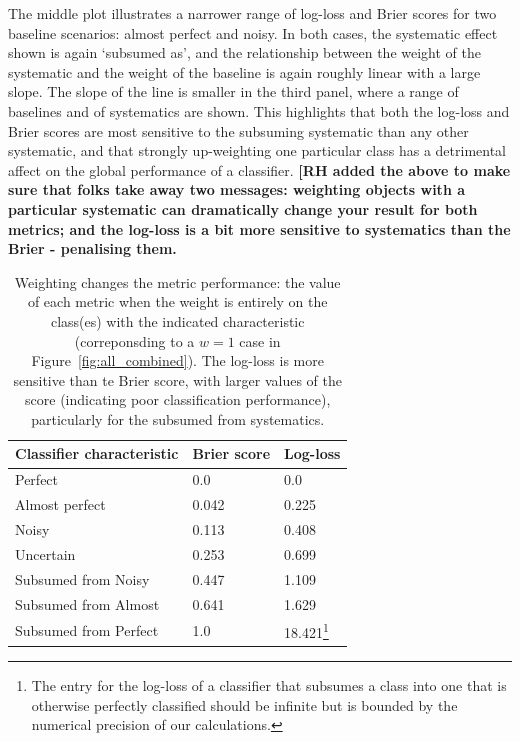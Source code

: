 The middle plot illustrates a narrower range of log-loss and Brier scores for two baseline scenarios: almost perfect and noisy.
In both cases, the systematic effect shown is again `subsumed as', and the relationship between the weight of the systematic and the weight of the baseline is again roughly linear with a large slope. 
The slope of the line is smaller in the third panel, where a range of baselines and of systematics are shown. This highlights that both the log-loss and Brier scores are most sensitive to the subsuming systematic than any other systematic, and that strongly up-weighting one particular class has a detrimental affect on the global performance of a classifier.
\textbf{[RH added the above to make sure that folks take away two messages: weighting objects with a particular systematic can dramatically change your result for both metrics; and the log-loss is a bit more sensitive to systematics than the Brier - penalising them.}





\begin{table}[]
\begin{tabular}{lll}
Classifier characteristic & Brier score & Log-loss\\
\hline
Perfect & 0.0 & 0.0\\
Almost perfect & 0.042 & 0.225\\
Noisy & 0.113 & 0.408\\
Uncertain & 0.253 & 0.699\\
Subsumed from Noisy & 0.447 & 1.109\\
Subsumed from Almost & 0.641 & 1.629\\
Subsumed from Perfect & 1.0 & 18.421\footnote{The entry for the log-loss of a classifier that subsumes a class into one that is otherwise perfectly classified should be infinite but is bounded by the numerical precision of our calculations.}
\end{tabular}
\caption{Weighting changes the metric performance: the value of each metric when the weight is entirely on the class(es) with the indicated characteristic (correponsding to a $w=1$ case in Figure~\ref{fig:all_combined}). The log-loss is more sensitive than te Brier score, with larger values of the score (indicating poor classification performance), particularly for the subsumed from systematics.}
\label{tab:extents}
\end{table}

